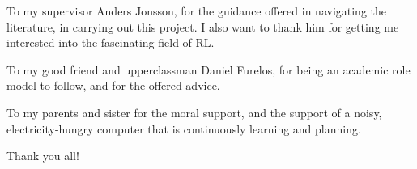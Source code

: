 \newpage
\thispagestyle{empty}
\vfill
{}

To my supervisor Anders Jonsson, for the guidance offered in navigating the
literature, in carrying out this project. I also want to thank him for getting
me interested into the fascinating field of \acs{RL}.

To my good friend and upperclassman Daniel Furelos, for being an academic role
model to follow, and for the offered advice.

To my parents and sister for the moral support, and the support of a noisy,
electricity-hungry computer that is continuously learning and planning.

Thank you all!
\vfill